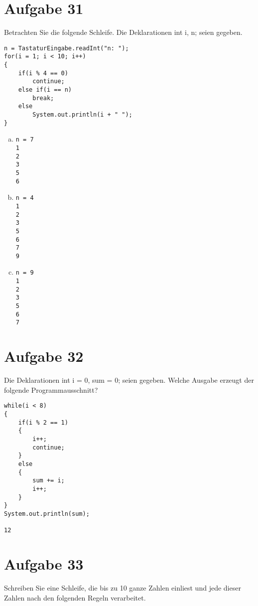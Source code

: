 \documentclass[10pt, oneside]{article}
\begin{document}
\section{Aufgabe 31}

Betrachten Sie die folgende Schleife. Die Deklarationen int i, n; seien gegeben.

\begin{verbatim}
n = TastaturEingabe.readInt("n: ");
for(i = 1; i < 10; i++)
{
    if(i % 4 == 0)
        continue;
    else if(i == n)
        break;
    else
        System.out.println(i + " ");
}
\end{verbatim}

\begin{enumerate}[(a)]
\item
\begin{verbatim}
n = 7
1
2
3
5
6
\end{verbatim}

\item
\begin{verbatim}
n = 4
1
2
3
5
6
7
9
\end{verbatim}

\item
\begin{verbatim}
n = 9
1
2
3
5
6
7
\end{verbatim}

\end{enumerate}

\section{Aufgabe 32}

Die Deklarationen int i = 0, sum = 0; seien gegeben. Welche Ausgabe
erzeugt der folgende Programmausschnitt?

\begin{verbatim}
while(i < 8)
{
    if(i % 2 == 1)
    {
        i++;
        continue;
    }
    else
    {
        sum += i;
        i++;
    }
}
System.out.println(sum);

12
\end{verbatim}

\section{Aufgabe 33}

Schreiben Sie eine Schleife, die bis zu 10 ganze Zahlen einliest und jede dieser Zahlen
nach den folgenden Regeln verarbeitet.
\end{document}
